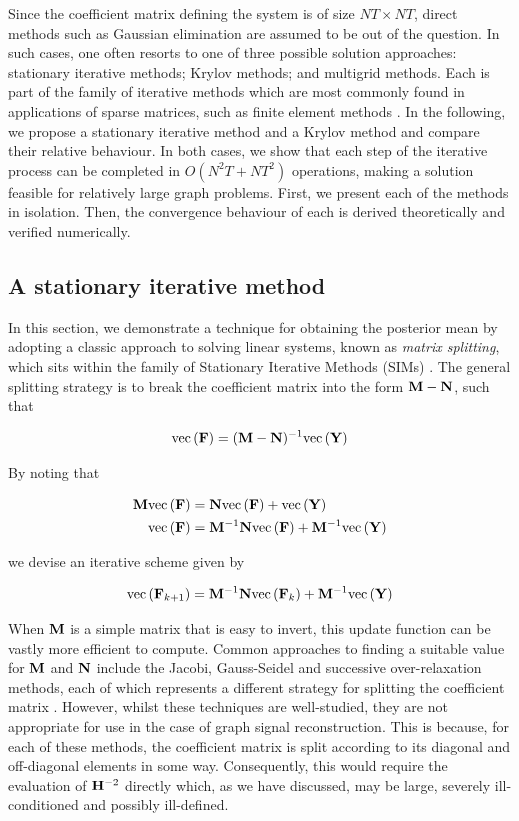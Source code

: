 Since the coefficient matrix defining the system is of size $NT \times NT $, direct methods such as Gaussian elimination are assumed to be out of the question. In such cases, one often resorts to one of three possible solution approaches: stationary iterative methods; Krylov methods; and multigrid methods. Each is part of the family of iterative methods which are most commonly found in applications of sparse matrices, such as finite element methods \citep{Brenner2008}. In the following, we propose a stationary iterative method and a Krylov method and compare their relative behaviour. In both cases, we show that each step of the iterative process can be completed in $O(N^2T + NT^2)$ operations, making a solution feasible for relatively large graph problems. First, we present each of the methods in isolation. Then, the convergence behaviour of each is derived theoretically and verified numerically.


\subsection{A stationary iterative method}

\label{sec:SIM}

In this section, we demonstrate a technique for obtaining the posterior mean by adopting a classic approach to solving linear systems, known as \textit{matrix splitting}, which sits within the family of Stationary Iterative Methods (SIMs) \citep{Saad2003}. The general splitting strategy is to break the coefficient matrix into the form $\mathbf{M} - \mathbf{N}$, such that 


\begin{equation}
    \text{\textup{vec}}\left(\mathbf{F}\right) = (\mathbf{M} - \mathbf{N})^{-1} \text{\textup{vec}}\left(\mathbf{Y}\right)
\end{equation}

By noting that

\begin{align}
    \mathbf{M} \text{\textup{vec}}\left(\mathbf{F}\right) &= \mathbf{N} \text{\textup{vec}}\left(\mathbf{F}\right) + \text{\textup{vec}}\left(\mathbf{Y}\right) \\
    \text{\textup{vec}}\left(\mathbf{F}\right) &= \mathbf{M}^{-1}\mathbf{N} \text{\textup{vec}}\left(\mathbf{F}\right) + \mathbf{M}^{-1} \text{\textup{vec}}\left(\mathbf{Y}\right)
\end{align}

we devise an iterative scheme given by 

\begin{equation}
    \label{eq:sim_update}
    \text{\textup{vec}}\left(\mathbf{F}_{k+1}\right) = \mathbf{M}^{-1}\mathbf{N} \text{\textup{vec}}\left(\mathbf{F}_{k}\right) + \mathbf{M}^{-1} \text{\textup{vec}}\left(\mathbf{Y}\right)
\end{equation}


When $\mathbf{M}$ is a simple matrix that is easy to invert, this update function can be vastly more efficient to compute. Common approaches to finding a suitable value for $\mathbf{M}$ and $\mathbf{N}$ include the Jacobi, Gauss-Seidel and successive over-relaxation methods, each of which represents a different strategy for splitting the coefficient matrix \citep{Saad2003}. However, whilst these techniques are well-studied, they are not appropriate for use in the case of graph signal reconstruction. This is because, for each of these methods, the coefficient matrix is split according to its diagonal and off-diagonal elements in some way. Consequently, this would require the evaluation of $\mathbf{H}^{-2}$ directly which, as we have discussed, may be large, severely ill-conditioned and possibly ill-defined. 


